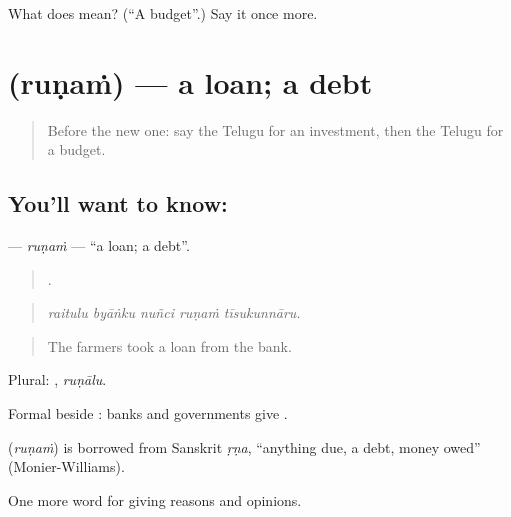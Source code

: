 \begin{tcolorbox}[breakable,colback=teal!4,colframe=teal!35!black,title={Before you move on}]
What does  mean? (\textquotedblleft{}A budget\textquotedblright{}.) Say it once more.
\end{tcolorbox}
\section[\texorpdfstring{\te{రుణం} (ruṇaṁ)}{రుణం (ruṇaṁ)}]{ (ruṇaṁ) — a loan; a debt}

\label{lesson:TE-C405-runam}



\begin{quote}
Before the new one: say the Telugu for an investment, then the Telugu for a budget.
\end{quote}

\subsection*{You'll want to know: }
\textbf{} — \emph{ruṇaṁ} — \textquotedblleft{}a loan; a debt\textquotedblright{}.

\begin{quote}
    .
\end{quote}

\begin{quote}
\emph{raitulu byāṅku nuñci ruṇaṁ tīsukunnāru.}
\end{quote}

\begin{quote}
The farmers took a loan from the bank.
\end{quote}

Plural: , \emph{ruṇālu}.

Formal beside : banks and governments give .

\begin{cousinweb}
\textbf{} (\emph{ruṇaṁ}) is borrowed from Sanskrit \emph{ṛṇa}, \textquotedblleft{}anything due, a debt, money owed\textquotedblright{} (Monier-Williams).
\end{cousinweb}

\begin{grammarlens}[title={What you've built}]
One more word for giving reasons and opinions.
\end{grammarlens}

